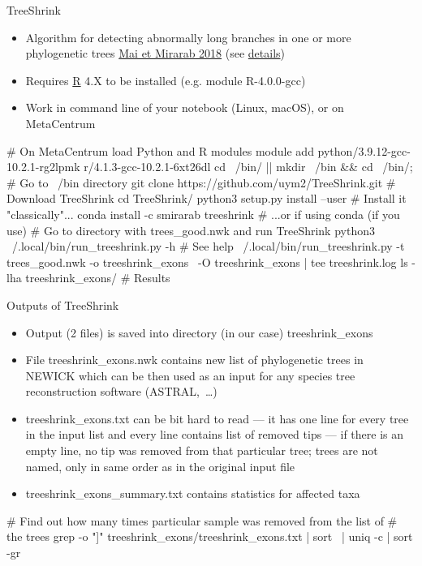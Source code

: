 \documentclass[compress,  xelatex, 11pt, xcolor=x11names, aspectratio=169,
	hyperref={
		bookmarks=true,
		unicode=true,
		colorlinks=true,
		pdftitle={HybSeq course},
		plainpages=false,
		pdfauthor={Vojtech Zeisek},
		pdfsubject={Practical processing of HybSeq target enrichment sequencing data on computing grids like MetaCentrum},
		pdfcreator={XeLaTeX},
		pdfkeywords={BASH, command line, GNU, HybSeq, Linux, MetaCentrum, sequencing shell, target enrichment},
		linkcolor=Turquoise4, %
		anchorcolor=DodgerBlue4, %
		citecolor=DodgerBlue4, %
		filecolor=DodgerBlue4, %
		menucolor=Tan4, %
		urlcolor=DarkOliveGreen4 %
		},
	url={hyphens, lowtilde} %
	]{beamer}
\renewcommand{\texttt}[1]{\colorbox{Cornsilk2}{{\ttfamily #1}}}
\begin{document}
\begin{frame}[fragile]{TreeShrink}
	\begin{itemize}
		\item Algorithm for detecting abnormally long branches in one or more phylogenetic trees \href{https://bmcgenomics.biomedcentral.com/articles/10.1186/s12864-018-4620-2}{Mai et Mirarab 2018} (see \href{https://github.com/uym2/TreeShrink}{details})
		\item Requires \href{https://www.r-project.org/}{R} 4.X to be installed (e.g. module \texttt{R-4.0.0-gcc})
		\item Work in command line of your notebook (Linux, macOS), or on MetaCentrum
	\end{itemize}
	\begin{bashcode}
    # On MetaCentrum load Python and R modules
    module add python/3.9.12-gcc-10.2.1-rg2lpmk r/4.1.3-gcc-10.2.1-6xt26dl
    cd ~/bin/ || { mkdir ~/bin && cd ~/bin/; } # Go to ~/bin directory
    git clone https://github.com/uym2/TreeShrink.git # Download TreeShrink
    cd TreeShrink/
    python3 setup.py install --user # Install it "classically"...
    conda install -c smirarab treeshrink # ...or if using conda (if you use)
    # Go to directory with trees_good.nwk and run TreeShrink
    python3 ~/.local/bin/run_treeshrink.py -h # See help
    ~/.local/bin/run_treeshrink.py -t trees_good.nwk -o treeshrink_exons \
      -O treeshrink_exons | tee treeshrink.log
    ls -lha treeshrink_exons/ # Results
	\end{bashcode}
\end{frame}

\begin{frame} [fragile]{Outputs of TreeShrink}
	\begin{itemize}
		\item Output (2 files) is saved into directory (in our case) \texttt{treeshrink\_exons}
		\item File \texttt{treeshrink\_exons.nwk} contains new list of phylogenetic trees in \texttt{NEWICK} which can be then used as an input for any species tree reconstruction software (ASTRAL,~\ldots)
		\item \texttt{treeshrink\_exons.txt} can be bit hard to read --- it has one line for every tree in the input list and every line contains list of removed tips --- if there is an empty line, no tip was removed from that particular tree; trees are not named, only in same order as in the original input file
		\item \texttt{treeshrink\_exons\_summary.txt} contains statistics for affected taxa
	\end{itemize}
	\begin{bashcode}
    # Find out how many times particular sample was removed from the list of
    # the trees
    grep -o "\<[[:graph:]]\+\>" treeshrink_exons/treeshrink_exons.txt | sort \
      | uniq -c | sort -gr
	\end{bashcode}
\end{frame}
\end{document}
